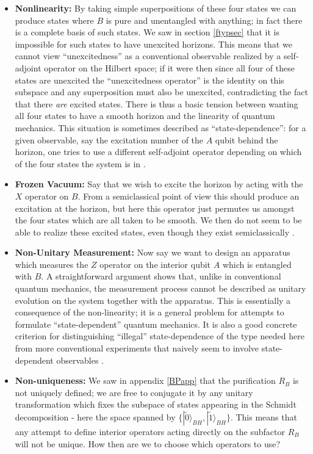 \documentclass[12pt]{article}
\newcommand{\ran}{\rangle}
\newcommand{\wt}{\widetilde}
\begin{document}
\begin{itemize}
\item \textbf{Nonlinearity:} By taking simple superpositions of these four states we can produce states where $B$ is pure and unentangled with anything; in fact there is a complete basis of such states.  We saw in section \ref{ftypsec} that it is impossible for such states to have unexcited horizons.  This means that we cannot view ``unexcitedness'' as a conventional observable realized by a self-adjoint operator on the Hilbert space; if it were then since all four of these states are unexcited the ``unexcitedness operator'' is the identity on this subspace and any superposition must also be unexcited, contradicting the fact that there \textit{are} excited states.   There is thus a basic tension between wanting all four states to have a smooth horizon and the linearity of quantum mechanics.  This situation is sometimes described as ``state-dependence'': for a given observable, say the excitation number of the $A$ qubit behind the horizon, one tries to use a different self-adjoint operator depending on which of the four states the system is in \cite{Almheiri:2013hfa}.
\item \textbf{Frozen Vacuum:} Say that we wish to excite the horizon by acting with the $X$ operator on $B$.  From a semiclassical point of view this should produce an excitation at the horizon, but here this operator just permutes us amongst the four states which are all taken to be smooth.  We then do not seem to be able to realize these excited states, even though they exist semiclassically \cite{Almheiri:2013hfa,Bousso:2013ifa,Harlow:2014yoa}.  
\item \textbf{Non-Unitary Measurement:} Now say we want to design an apparatus which measures the $Z$ operator on the interior qubit $A$ which is entangled with $B$.  A straightforward argument \cite{Harlow:2014yoa} shows that, unlike in conventional quantum mechanics, the measurement process cannot be described as unitary evolution on the system together with the apparatus.  This is essentially a consequence of the non-linearity; it is a general problem for attempts to formulate ``state-dependent'' quantum mechanics.  It is also a good concrete criterion for distinguishing ``illegal'' state-dependence of the type needed here from more conventional experiments that naively seem to involve state-dependent observables \cite{Harlow:2014yoa}.  
\item \textbf{Non-uniqueness:} We saw in appendix \eqref{BPapp} that the purification $R_B$ is not uniquely defined; we are free to conjugate it by any unitary transformation which fixes the subspace of states appearing in the Schmidt decomposition - here the space spanned by $\{|\wt{0}\ran_{BH},|\wt{1}\ran_{BH}\}$.  This means that any attempt to define interior operators acting directly on the subfactor $R_B$ will not be unique.  How then are we to choose which operators to use?

\end{itemize}
\end{document}
